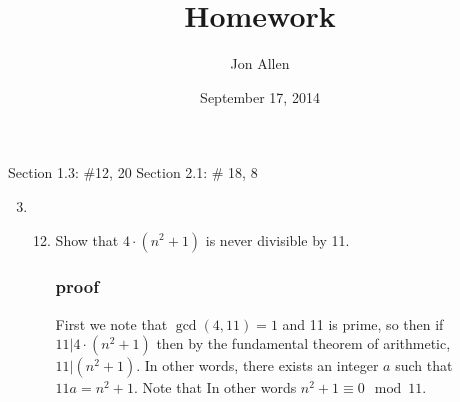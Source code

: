 \documentclass[letterpaper]{article}
\begin{document}
\title{Homework}
\date{September 17, 2014}
\author{Jon Allen}
\maketitle
Section 1.3: \#12, 20
Section 2.1: \# 18, 8
\renewcommand{\labelenumi}{1.\arabic{enumi}}
\renewcommand{\labelenumii}{\arabic{enumii}.}
\renewcommand{\labelenumiii}{(\alph{enumiii})}
\begin{enumerate}
\setcounter{enumi}{2}
\item
\begin{enumerate}
\setcounter{enumii}{11}
\item
Show that $4\cdot(n^2+1)$ is never divisible by 11.
\subsubsection*{proof}
First we note that $\gcd(4,11)=1$ and 11 is prime, so then if $11|4\cdot(n^2+1)$ then by the fundamental theorem of arithmetic, $11|(n^2+1)$.
In other words, there exists an integer $a$ such that $11a=n^2+1$.
Note that 
In other words $n^2+1\equiv0\mod11$.


\end{enumerate}
\end{enumerate}
\end{document}
